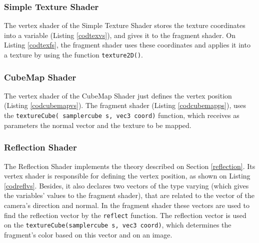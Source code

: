 \documentclass[10pt, conference, compsocconf]{IEEEtran}
\begin{document}
{\subsubsection{Simple Texture Shader}

	The vertex shader of the Simple Texture Shader stores the texture coordinates into a variable (Listing \ref{codtexvs}),  and gives it to the fragment shader. On Listing \ref{codtexfs}, 
the fragment shader uses these coordinates and applies it into a texture by using the function \texttt{texture2D()}.

	

	

\subsubsection{CubeMap Shader}	

 	The vertex shader of the CubeMap Shader just defines the vertex position (Listing \ref{codcubemapvs}). The fragment shader (Listing \ref{codcubemapps}), uses the \texttt{textureCube( samplercube s, vec3 coord)} function,
which receives as parameters the normal vector and the texture to be mapped.

	

	

\subsubsection{Reflection Shader}

	The Reflection Shader implements the theory described on Section \ref{reflection}. Its vertex shader is responsible for defining the vertex position, as shown on Listing \ref{codreflvs}. Besides, it also declares two vectors of the type varying (which gives the variables' values to the fragment shader), that are related to the vector of the camera's direction and normal. In the fragment shader these vectors are used to find the reflection vector by the \texttt{reflect} function. The reflection vector is used on the  \texttt{textureCube(samplercube s, vec3 coord)}, which determines the fragment's color based on this vector and on an image. 

}
\end{document}
